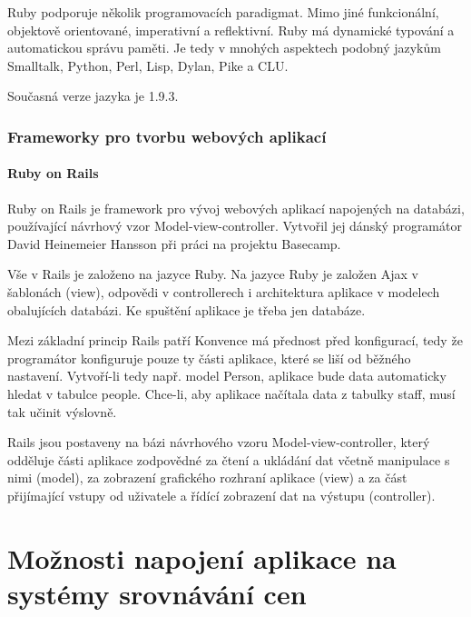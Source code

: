 Ruby podporuje několik programovacích paradigmat. Mimo jiné funkcionální, objektově orientované, imperativní a reflektivní. Ruby má dynamické typování a automatickou správu paměti. Je tedy v mnohých aspektech podobný jazykům Smalltalk, Python, Perl, Lisp, Dylan, Pike a CLU.

Současná verze jazyka je 1.9.3.
\subsubsection{Frameworky pro tvorbu webových aplikací}
\paragraph{Ruby on Rails}
Ruby on Rails je framework pro vývoj webových aplikací napojených na databázi, používající návrhový vzor Model-view-controller. Vytvořil jej dánský programátor David Heinemeier Hansson při práci na projektu Basecamp.

Vše v Rails je založeno na jazyce Ruby. Na jazyce Ruby je založen Ajax v šablonách (view), odpovědi v controllerech i architektura aplikace v modelech obalujících databázi. Ke spuštění aplikace je třeba jen databáze.

Mezi základní princip Rails patří Konvence má přednost před konfigurací, tedy že programátor konfiguruje pouze ty části aplikace, které se liší od běžného nastavení. Vytvoří-li tedy např. model Person, aplikace bude data automaticky hledat v tabulce people. Chce-li, aby aplikace načítala data z tabulky staff, musí tak učinit výslovně.

Rails jsou postaveny na bázi návrhového vzoru Model-view-controller, který odděluje části aplikace zodpovědné za čtení a ukládání dat včetně manipulace s nimi (model), za zobrazení grafického rozhraní aplikace (view) a za část přijímající vstupy od uživatele a řídící zobrazení dat na výstupu (controller).

\section{Možnosti napojení aplikace na systémy srovnávání cen}